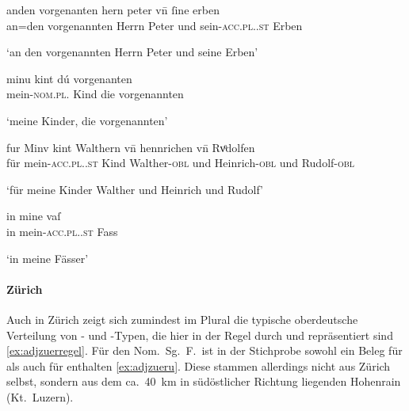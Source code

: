 \begin{exe}
\ex \label{ex:adjbaselregel}
	\begin{xlist}
	\ex \label{ex:adjbaselregel_1}
		\gll anden vorgenanten hern peter vn̄ ſine erben \\
			an=den vorgenannten Herrn Peter und sein-\textsc{acc.pl.\MascM.st}
				Erben \\
		\begin{taggedline}{\parencites(Basel, 1293)[\pno~1682, 16.15--16]{cao3}}
		\trans `an den vorgenannten Herrn Peter und seine Erben'
		\end{taggedline}

	\ex \label{ex:adjbaselregel_2}
		\gll minu kint dú vorgenanten \\
			mein-\textsc{nom.pl.\NeutMF} Kind die vorgenannten \\
		\begin{taggedline}{\parencites(Rheinfelden, Kt.~Aargau, 1299)[\pno~3184, 376.13]{cao4}}
		\trans `meine Kinder, die vorgenannten'
		\end{taggedline}
	\end{xlist}

\ex \label{ex:adjbaselu}
	\begin{xlist}
	\ex \label{ex:adjbaselu_1}
		\gll fur Minv kint Walthern vn̄ hennrichen vn̄ Rvͦdolfen \\
			für mein-\textsc{acc.pl.\NeutM.st} Kind Walther-\textsc{obl} und
			Heinrich-\textsc{obl} und Rudolf-\textsc{obl} \\
		\begin{taggedline}{\parencites(Basel, 1289)[\pno~1108, 402.36--37]{cao2}}
		\trans `für meine Kinder Walther und Heinrich und Rudolf'
		\end{taggedline}

	\ex \label{ex:adjbaselu_2}
		\gll in mine vaſ \\
			in mein-\textsc{acc.pl.\NeutI.st} Fass \\
		\begin{taggedline}{\parencites(Mulhouse, Dépt.~Haut-Rhin, 1291)[\pno~N~483, 351.23]{cao5}}
		\trans `in meine Fässer'
		\end{taggedline}
	\end{xlist}
\end{exe}

\paragraph{Zürich}
\label{par:adjzuerich}
Auch in Zürich zeigt sich zumindest im Plural die typische oberdeutsche
Verteilung von - und -Typen, die hier in der Regel durch
 und  repräsentiert sind \cref{ex:adjzuerregel}. Für den Nom.\
Sg.\ F.\ ist in der Stichprobe sowohl ein Beleg für  als auch für
\norm{-e} enthalten \cref{ex:adjzueru}. Diese stammen allerdings nicht aus
Zürich selbst, sondern aus dem ca.\ 40~km in südöstlicher Richtung liegenden
Hohenrain (Kt.~Luzern).

